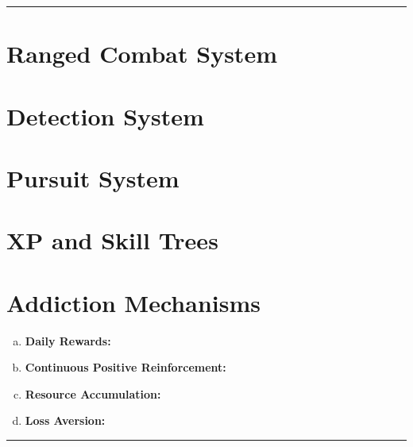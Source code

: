 \documentclass[12pt]{article}
\newcommand{\point}[1]{\item \textbf{#1:}}
\newcommand{\drawline}{\vspace{2mm}\hrule}
\begin{document}
\drawline

\section{Ranged Combat System}

\section{Detection System}

\section{Pursuit System}

\section{XP and Skill Trees}

\section{Addiction Mechanisms}

\begin{enumerate}[a)]

\point{Daily Rewards}

\point{Continuous Positive Reinforcement}

\point{Resource Accumulation}

\point{Loss Aversion}

\end{enumerate}

\drawline
\end{document}

